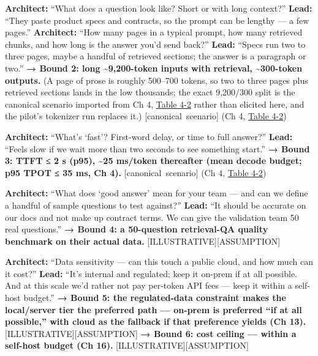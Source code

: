 \textbf{Architect:} ``What does a question look like? Short or with long
context?'' \textbf{Lead:} ``They paste product specs and contracts, so
the prompt can be lengthy --- a few pages.'' \textbf{Architect:} ``How
many pages in a typical prompt, how many retrieved chunks, and how long
is the answer you'd send back?'' \textbf{Lead:} ``Specs run two to three
pages, maybe a handful of retrieved sections; the answer is a paragraph
or two.'' \textbf{→ Bound 2: long \textasciitilde9,200-token inputs with
retrieval, \textasciitilde300-token outputs.} (A page of prose is
roughly 500--700 tokens, so two to three pages plus retrieved sections
lands in the low thousands; the exact 9,200/300 split is the canonical
scenario imported from Ch 4, \hyperref[tab:4.2]{Table 4-2} rather than elicited here, and
the pilot's tokenizer run replaces it.) \mbox{{[}canonical scenario{]}} (Ch 4,
\hyperref[tab:4.2]{Table 4-2})

\textbf{Architect:} ``What's `fast'? First-word delay, or time to full
answer?'' \textbf{Lead:} ``Feels slow if we wait more than two seconds
to see something start.'' \textbf{→ Bound 3: TTFT ≤ 2 s (p95),
\textasciitilde25 ms/token thereafter (mean decode budget; p95 TPOT ≤ 35
ms, Ch 4).} \mbox{{[}canonical scenario{]}} (Ch 4, \hyperref[tab:4.2]{Table 4-2})

\textbf{Architect:} ``What does `good answer' mean for your team --- and
can we define a handful of sample questions to test against?''
\textbf{Lead:} ``It should be accurate on our docs and not make up
contract terms. We can give the validation team 50 real questions.''
\textbf{→ Bound 4: a 50-question retrieval-QA quality benchmark on their
actual data.} \mbox{{[}ILLUSTRATIVE{]}}\hspace{0pt}\mbox{{[}ASSUMPTION{]}}

\textbf{Architect:} ``Data sensitivity --- can this touch a public
cloud, and how much can it cost?'' \textbf{Lead:} ``It's internal and
regulated; keep it on-prem if at all possible. And at this scale we'd
rather not pay per-token API fees --- keep it within a self-host
budget.'' \textbf{→ Bound 5: the regulated-data constraint makes the
local/server tier the preferred path --- on-prem is preferred ``if at
all possible,'' with cloud as the fallback if that preference yields (Ch
13).} \mbox{{[}ILLUSTRATIVE{]}}\hspace{0pt}\mbox{{[}ASSUMPTION{]}} \textbf{→ Bound 6: cost ceiling
--- within a self-host budget (Ch 16).}
\mbox{{[}ILLUSTRATIVE{]}}\hspace{0pt}\mbox{{[}ASSUMPTION{]}}

